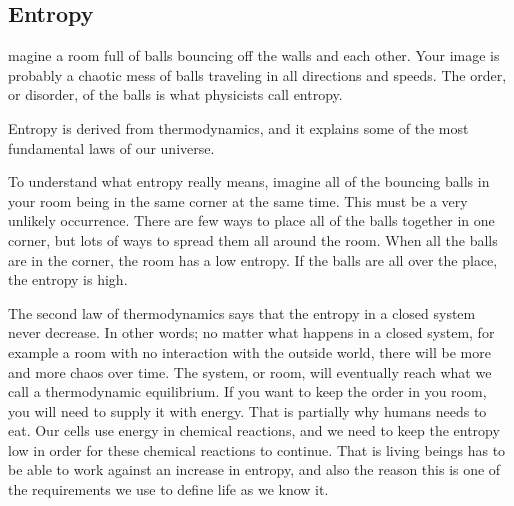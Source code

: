 \subsection{Entropy}
magine a room full of balls bouncing off the walls and each other.
Your image is probably a chaotic mess of balls traveling in all directions and speeds.
The order, or disorder, of the balls is what physicists call entropy.

Entropy is derived from thermodynamics, and it explains some of the most fundamental laws of our universe.

To understand what entropy really means, imagine all of the bouncing balls in your room being in the same corner at the same time.
This must be a very unlikely occurrence.
There are few ways to place all of the balls together in one corner, but lots of ways to spread them all around the room.
When all the balls are in the corner, the room has a low entropy.
If the balls are all over the place, the entropy is high.


The second law of thermodynamics says that the entropy in a closed system never decrease.
In other words; no matter what happens in a closed system, for example a room with no interaction with the outside world, there will be more and more chaos over time.
The system, or room, will eventually reach what we call a thermodynamic equilibrium.
If you want to keep the order in you room, you will need to supply it with energy.
That is partially why humans needs to eat.
Our cells use energy in chemical reactions, and we need to keep the entropy low in order for these chemical reactions to continue.
That is living beings has to be able to work against an increase in entropy, and also the reason this is one of the requirements we use to define life as we know it.